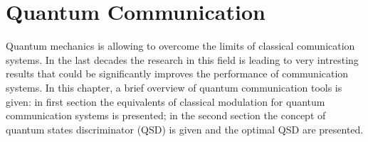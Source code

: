 
\chapter{Quantum Communication}
    Quantum mechanics is allowing to overcome the limits of classical comunication systems. In 
    the last decades the research in this field is leading to very intresting results that could 
    be significantly improves the performance of communication systems. In this chapter, a brief
    overview of quantum communication tools is given: in first section the equivalents
    of classical modulation for quantum communication systems is presented; in the second section 
    the concept of quantum states discriminator (QSD) is given and the optimal QSD are presented.

    
    
